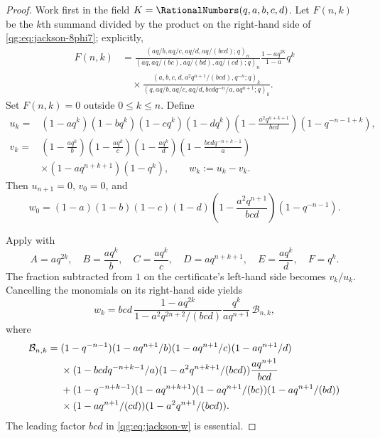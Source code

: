 \begin{proof}
Work first in the field $K=\RationalNumbers(q,a,b,c,d)$.  Let $F(n,k)$ be the
$k$th summand divided by the product on the right-hand side of
\eqref{qg:eq:jackson-8phi7}; explicitly,
\begin{align*}
F(n,k)&=
 \frac{(aq/b,aq/c,aq/d,aq/(bcd);q)_n}
 {(aq,aq/(bc),aq/(bd),aq/(cd);q)_n}
 \frac{1-aq^{2k}}{1-a}q^k\\
&\quad\times
 \frac{(a,b,c,d,a^2q^{n+1}/(bcd),q^{-n};q)_k}
 {(q,aq/b,aq/c,aq/d,bcdq^{-n}/a,aq^{n+1};q)_k}.
\end{align*}
Set $F(n,k)=0$ outside $0\le k\le n$.  Define
\begin{align*}
u_k={}&(1-aq^k)(1-bq^k)(1-cq^k)(1-dq^k)
 \left(1-\frac{a^2q^{n+k+1}}{bcd}\right)
 (1-q^{-n-1+k}),\\
v_k={}&\left(1-\frac{aq^k}{b}\right)
 \left(1-\frac{aq^k}{c}\right)
 \left(1-\frac{aq^k}{d}\right)
 \left(1-\frac{bcdq^{-n+k-1}}a\right)\\
&\times(1-aq^{n+k+1})(1-q^k),
\qquad
w_k:=u_k-v_k.
\end{align*}
Then $u_{n+1}=0$, $v_0=0$, and
\begin{equation}
\label{qg:eq:jackson-w0}
w_0=(1-a)(1-b)(1-c)(1-d)
 \left(1-\frac{a^2q^{n+1}}{bcd}\right)(1-q^{-n-1}).
\end{equation}

Apply  with
\begin{equation}
\label{qg:eq:jackson-certificate-substitution}
A=aq^{2k},\quad B=\frac{aq^k}{b},\quad
C=\frac{aq^k}{c},\quad D=aq^{n+k+1},\quad
E=\frac{aq^k}{d},\quad F=q^k.
\end{equation}
The fraction subtracted from $1$ on the certificate's left-hand side becomes
$v_k/u_k$.  Cancelling the monomials on its right-hand side yields
\begin{equation}
\label{qg:eq:jackson-w}
w_k=bcd\,
 \frac{1-aq^{2k}}{1-a^2q^{2n+2}/(bcd)}
 \frac{q^k}{aq^{n+1}}\,\mathcal B_{n,k},
\end{equation}
where
\begin{align}
\mathcal B_{n,k}={}&
 (1-q^{-n-1})(1-aq^{n+1}/b)(1-aq^{n+1}/c)(1-aq^{n+1}/d)
 \notag\\
&\times(1-bcdq^{-n+k-1}/a)(1-a^2q^{n+k+1}/(bcd))
 \frac{aq^{n+1}}{bcd}
 \notag\\
&+(1-q^{-n+k-1})(1-aq^{n+k+1})
 (1-aq^{n+1}/(bc))(1-aq^{n+1}/(bd))
 \notag\\
&\times(1-aq^{n+1}/(cd))(1-a^2q^{n+1}/(bcd)).
\label{qg:eq:jackson-B}
\end{align}
The leading factor $bcd$ in \eqref{qg:eq:jackson-w} is essential.


\end{proof}
